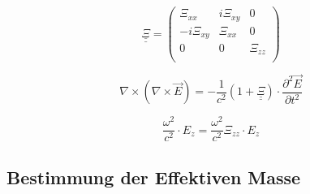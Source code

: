 \begin{equation}
    \underline{\underline{\Xi}} = 
    \begin{pmatrix}
        \Xi_{xx} & i \Xi_{xy} & 0\\
        -i \Xi_{xy} & \Xi_{xx} & 0\\
        0 & 0 & \Xi_{zz}\\
    \end{pmatrix}
\end{equation}

\begin{equation}
    \nabla \times \left( \nabla \times \vec{E} \right) = -\frac{1}{c^2} \left( 1 + \underline{\underline{\Xi}} \right) \cdot \frac{\partial^2 \vec{E}}{\partial t^2}
\end{equation}

\begin{equation}
    \frac{\omega^2}{c^2} \cdot E_z = \frac{\omega^2}{c^2} \Xi_{zz} \cdot E_z
\end{equation}



\subsection{Bestimmung der Effektiven Masse}